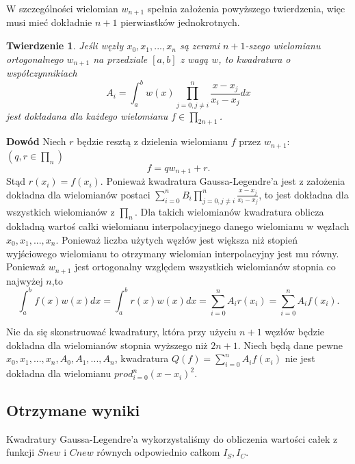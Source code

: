 \documentclass{article}
\newtheorem{theorem}{Twierdzenie}
\begin{document}
W szczególności wielomian $w_{n+1}$ spełnia założenia powyższego twierdzenia, więc musi mieć dokładnie $n+1$ pierwiastków jednokrotnych.

\begin{theorem}
	Jeśli węzły $x_0,x_1,...,x_n$ są zerami $n+1$-szego wielomianu ortogonalnego $w_{n+1}$ na przedziale $[a,b]$ z wagą $w$, to kwadratura o współczynnikiach
	\[A_i=\int_a^b w(x)\prod_{j=0,j\neq i}^n \frac{x-x_j}{x_i-x_j} dx\] jest dokładana dla każdego wielomianu $f\in\prod_{2n+1}$.
\end{theorem}

\textbf{Dowód} Niech $r$ będzie resztą z dzielenia wielomianu $f$ przez $w_{n+1}$: $(q,r\in \prod_{n})$\[f = qw_{n+1} + r .\] Stąd $r(x_i) = f(x_i)$. Ponieważ kwadratura Gaussa-Legendre'a jest z założenia dokładna dla wielomianów postaci $\sum_{i=0}^n B_i\prod_{j=0,j\neq i}^n \frac{x-x_j}{x_i-x_j}$, to jest dokładna dla wszystkich wielomianów z $\prod_n$. Dla takich wielomianów kwadratura oblicza dokładną wartoś całki wielomianu interpolacyjnego danego wielomianu w węzłach $x_0,x_1,...,x_n$. Ponieważ liczba użytych węzłów jest większa niż stopień wyjściowego wielomianu to otrzymany wielomian interpolacyjny jest mu równy. Ponieważ $w_{n+1}$ jest ortogonalny względem wszystkich wielomianów stopnia co najwyżej $n$,to \[\int_a^b f(x)w(x)dx = \int_a^b r(x)w(x)dx = \sum_{i=0}^n A_ir(x_i) = \sum_{i=0}^n A_if(x_i).\] 

Nie da się skonstruować kwadratury, która przy użyciu $n+1$ węzłów będzie dokładna dla wielomianów stopnia wyższego niż $2n+1$. Niech będą dane pewne $x_0,x_1,...,x_n,A_0,A_1,...,A_n$, kwadratura $Q(f) = \sum_{i=0}^n A_if(x_i)$ nie jest dokładna dla wielomianu $prod_{i=0}^n (x-x_i)^2$.

\subsection{Otrzymane wyniki}
	Kwadratury Gaussa-Legendre'a wykorzystaliśmy do obliczenia wartości całek z funkcji $Snew$ i $Cnew$ równych odpowiednio całkom $I_S,I_C$.
\end{document}
